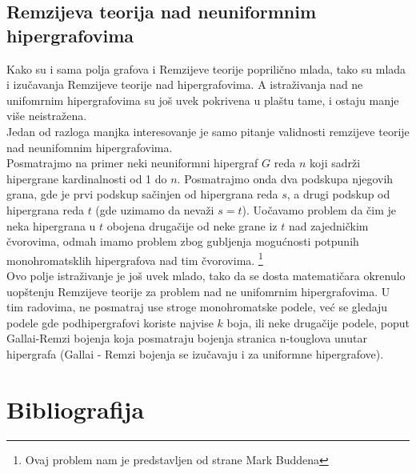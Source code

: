 \documentclass[a4paper]{article}
\begin{document}
	\subsection{Remzijeva teorija nad neuniformnim hipergrafovima}\label{neuniformni}
	
	Kako su i sama polja grafova i Remzijeve teorije poprilično mlada, tako su mlada i izučavanja Remzijeve teorije nad hipergrafovima. A istraživanja nad ne unifomrnim hipergrafovima su još uvek pokrivena u plaštu tame, i ostaju manje više neistražena. \\
	Jedan od razloga manjka interesovanje je samo pitanje validnosti remzijeve teorije nad neunifomnim hipergrafovima.\\
	Posmatrajmo na primer neki neuniformni hipergraf $G$ reda $n$ koji sadrži hipergrane kardinalnosti od 1 do $n$. Posmatrajmo onda dva podskupa njegovih grana, gde je prvi podskup sačinjen od  hipergrana reda $s$, a drugi podskup od hipergrana reda $t$ (gde uzimamo da nevaži $s=t$). Uočavamo problem da čim je neka hipergrana u $t$ obojena drugačije od neke grane iz $t$ nad zajedničkim čvorovima, odmah imamo problem zbog gubljenja mogućnosti potpunih monohromatsklih hipergrafova nad tim čvorovima.  \footnote{Ovaj problem nam je predstavljen od strane Mark Buddena} %
	\\Ovo polje istraživanje je još uvek mlado, tako da se dosta matematičara okrenulo uopštenju Remzijeve teorije za problem nad ne unifomrnim hipergrafovima. U tim radovima, ne posmatraj use stroge monohromatske podele, već se gledaju podele gde podhipergrafovi koriste najvise $k$ boja, ili neke drugačije podele, poput Gallai-Remzi bojenja koja posmatraju bojenja stranica n-touglova unutar hipergrafa (Gallai - Remzi bojenja se izučavaju i za uniformne hipergrafove).
	\section{Bibliografija}	
	\printbibliography
\end{document}
